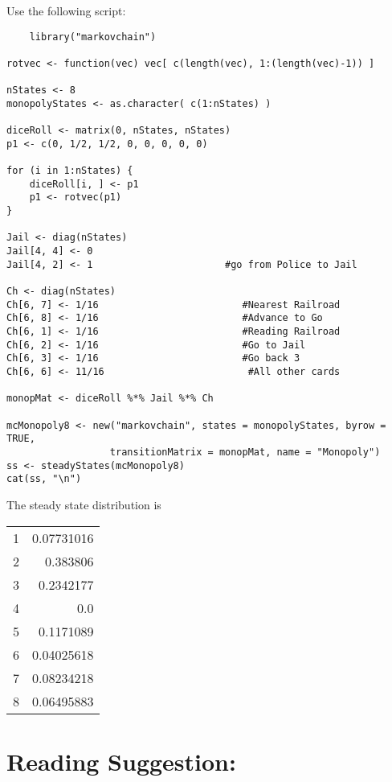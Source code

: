\documentclass[12pt]{article}
\begin{document}
\begin{solution}
    Use the following script:
\begin{lstlisting}
    library("markovchain")

rotvec <- function(vec) vec[ c(length(vec), 1:(length(vec)-1)) ]

nStates <- 8
monopolyStates <- as.character( c(1:nStates) )

diceRoll <- matrix(0, nStates, nStates)
p1 <- c(0, 1/2, 1/2, 0, 0, 0, 0, 0)

for (i in 1:nStates) {
    diceRoll[i, ] <- p1
    p1 <- rotvec(p1)
}

Jail <- diag(nStates)
Jail[4, 4] <- 0
Jail[4, 2] <- 1                       #go from Police to Jail

Ch <- diag(nStates)
Ch[6, 7] <- 1/16                         #Nearest Railroad
Ch[6, 8] <- 1/16                         #Advance to Go
Ch[6, 1] <- 1/16                         #Reading Railroad
Ch[6, 2] <- 1/16                         #Go to Jail
Ch[6, 3] <- 1/16                         #Go back 3
Ch[6, 6] <- 11/16                         #All other cards

monopMat <- diceRoll %*% Jail %*% Ch

mcMonopoly8 <- new("markovchain", states = monopolyStates, byrow = TRUE,
                  transitionMatrix = monopMat, name = "Monopoly")
ss <- steadyStates(mcMonopoly8)
cat(ss, "\n")
\end{lstlisting}

    The steady state distribution is \begin{tabular}{rr}
        1  & 0.07731016 \\ 
        2  & 0.383806   \\ 
        3  & 0.2342177  \\ 
        4  & 0.0        \\ 
        5  & 0.1171089  \\ 
        6  & 0.04025618 \\ 
        7  & 0.08234218 \\ 
        8  & 0.06495883 \\ 
    \end{tabular}
\end{solution}

\hr

\section*{Reading Suggestion:}
\end{document}
